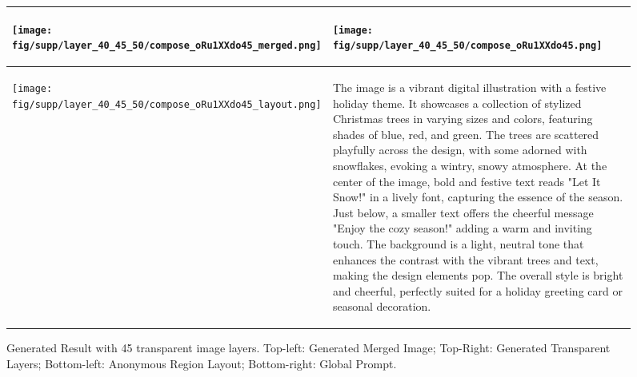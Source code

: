 \begin{figure*}[h]
\begin{tabular}{|p{}|p{}|}
\hline
\begin{center}
\texttt{[image: fig/supp/layer\_40\_45\_50/compose\_oRu1XXdo45\_merged.png]}
\end{center}
& 
\begin{flushleft}

\texttt{[image: fig/supp/layer\_40\_45\_50/compose\_oRu1XXdo45.png]}
\end{flushleft} \\
\hline
\begin{center}
\texttt{[image: fig/supp/layer\_40\_45\_50/compose\_oRu1XXdo45\_layout.png]}
\end{center}
& 
\begin{flushleft}
{\small The image is a vibrant digital illustration with a festive holiday theme. It showcases a collection of stylized Christmas trees in varying sizes and colors, featuring shades of blue, red, and green. The trees are scattered playfully across the design, with some adorned with snowflakes, evoking a wintry, snowy atmosphere. At the center of the image, bold and festive text reads "Let It Snow!" in a lively font, capturing the essence of the season. Just below, a smaller text offers the cheerful message "Enjoy the cozy  season!" adding a warm and inviting touch. The background is a light, neutral tone that enhances the contrast with the vibrant trees and text, making the design elements pop. The overall style is bright and cheerful, perfectly suited for a holiday greeting card or seasonal decoration.}
\end{flushleft} \\
\hline
\end{tabular}
\caption{Generated Result with 45 transparent image layers. Top-left: Generated Merged Image; Top-Right: Generated Transparent Layers; Bottom-left: Anonymous Region Layout; Bottom-right: Global Prompt.}
\label{fig:more_layer_45}
\end{figure*}



